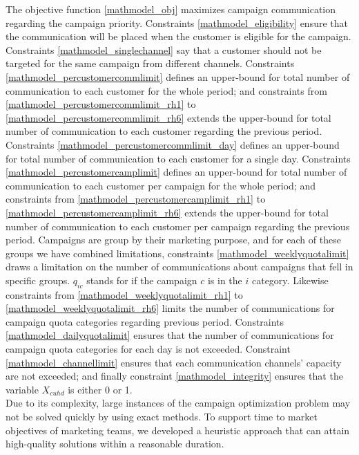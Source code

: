 \documentclass[11pt]{article}
\begin{document}
The objective function \eqref{mathmodel_obj} maximizes campaign communication regarding the campaign priority. Constraints \eqref{mathmodel_eligibility} ensure that the communication will be placed when the customer is eligible for the campaign. Constraints \eqref{mathmodel_singlechannel} say that a customer should not be targeted for the same campaign from different channels. Constraints \eqref{mathmodel_percustomercommlimit} defines an upper-bound for total number of communication to each customer for the whole period; and constraints from \eqref{mathmodel_percustomercommlimit_rh1} to \eqref{mathmodel_percustomercommlimit_rh6} extends the upper-bound for total number of communication to each customer regarding the previous period. Constraints \eqref{mathmodel_percustomercommlimit_day} defines an upper-bound for total number of communication to each customer for a single day. Constraints \eqref{mathmodel_percustomercamplimit} defines an upper-bound for total number of communication to each customer per campaign for the whole period; and constraints from \eqref{mathmodel_percustomercamplimit_rh1} to \eqref{mathmodel_percustomercamplimit_rh6} extends the upper-bound for total number of communication to each customer per campaign regarding the previous period. Campaigns are group by their marketing purpose, and for each of these groups we have combined limitations, constraints \eqref{mathmodel_weeklyquotalimit} draws a limitation on the number of communications about campaigns that fell in specific groups. $q_{{i}{c}}$ stands for if the campaign $c$ is in the $i$ category. Likewise constraints from \eqref{mathmodel_weeklyquotalimit_rh1} to \eqref{mathmodel_weeklyquotalimit_rh6} limits the number of communications for campaign quota categories regarding previous period. Constraints \eqref{mathmodel_dailyquotalimit} ensures that the number of communications for campaign quota categories for each day is not exceeded. Constraint \eqref{mathmodel_channellimit} ensures that each communication channels' capacity are not exceeded; and finally constraint \eqref{mathmodel_integrity} ensures that the variable $X_{{c}{u}{h}{d}}$ is either 0 or 1.\\

Due to its complexity, large instances of the campaign optimization problem may not be solved quickly by using exact methods. To support time to market objectives of marketing teams, we developed a heuristic approach that can attain high-quality solutions within a reasonable duration.

\end{document}

